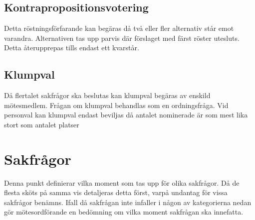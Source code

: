 \documentclass[11pt, includeaddress]{classes/cthit}
\begin{document}
\subsection{Kontrapropositionsvotering}
Detta röstningsförfarande kan begäras då två eller fler alternativ står emot varandra. Alternativen tas upp parvis där förslaget med färst röster utesluts. Detta återupprepas tills endast ett kvarstår.
\subsection{Klumpval}
Då flertalet sakfrågor ska beslutas kan klumpval begäras av enskild mötesmedlem. Frågan om klumpval behandlas som en ordningsfråga.
Vid personval kan klumpval endast beviljas då antalet nominerade är som mest lika stort som antalet platser

\section{Sakfrågor}
Denna punkt definierar vilka moment som tas upp för olika sakfrågor. Då de flesta sköts på samma vis detaljeras detta först, varpå undantag för vissa sakfrågor benämns.
Ifall då sakfrågan inte infaller i någon av kategorierna nedan gör mötesordförande en bedömning om vilka moment sakfrågan ska innefatta.
\end{document}
